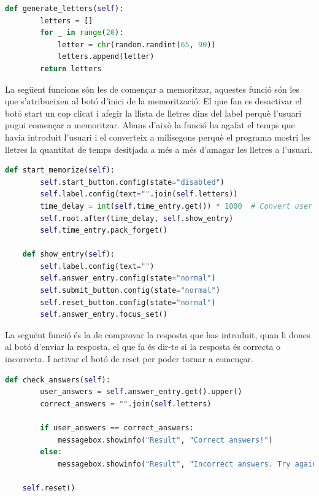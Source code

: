 \begin{lstlisting}[language=Python, style=colorEX, caption=Funció per generar lletres]
    def generate_letters(self):
        letters = []
        for _ in range(20):
            letter = chr(random.randint(65, 90))
            letters.append(letter)
        return letters
\end{lstlisting}

La següent funcions són les de començar a memoritzar, aquestes funció són les que s'atribueixen al botó d'inici de la memorització. El que fan es desactivar el botó start un cop clicat i afegir la llista de lletres dins del label perquè l'usuari pugui començar a memoritzar. Abans d'això la funció ha agafat el temps que havia introduit l'usuari i el converteix a milisegons perquè el programa mostri les lletres la quantitat de temps desitjada a més a més d'amagar les lletres a l'usuari.

\begin{lstlisting}[language=Python, style=colorEX, caption=Funcions pel botó d'inici]
    def start_memorize(self):
        self.start_button.config(state="disabled")
        self.label.config(text="".join(self.letters))
        time_delay = int(self.time_entry.get()) * 1000  # Convert user seconds to milliseconds
        self.root.after(time_delay, self.show_entry)
        self.time_entry.pack_forget()

    def show_entry(self):
        self.label.config(text="")
        self.answer_entry.config(state="normal")
        self.submit_button.config(state="normal")
        self.reset_button.config(state="normal")
        self.answer_entry.focus_set()
\end{lstlisting}

La seguënt funció és la de comprovar la resposta que has introduit, quan li dones al botó d'enviar la resposta, el que fa és dir-te si la resposta és correcta o incorrecta. I activar el botó de reset per poder tornar a començar.

\begin{lstlisting}[language=Python, style=colorEX, caption=Funció per comprovar la resposta]
    def check_answers(self):
        user_answers = self.answer_entry.get().upper()
        correct_answers = "".join(self.letters)

        if user_answers == correct_answers:
            messagebox.showinfo("Result", "Correct answers!")
        else:
            messagebox.showinfo("Result", "Incorrect answers. Try again.")

    self.reset()
\end{lstlisting}

